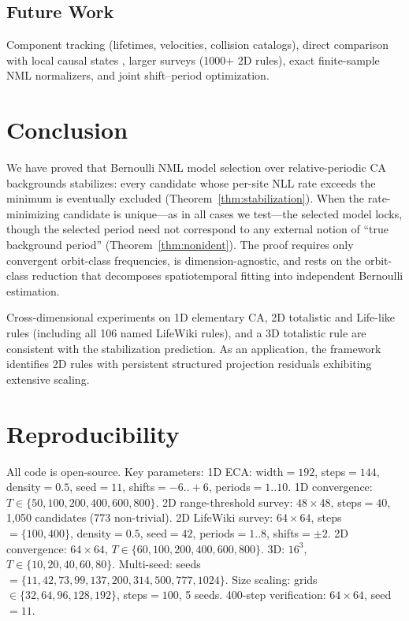 \documentclass[letterpaper]{article}
\theoremstyle{definition}
\theoremstyle{remark}
\begin{document}
\subsection{Future Work}

Component tracking (lifetimes, velocities, collision catalogs), direct comparison with local causal states \citep{rupe2018}, larger surveys (1000+ 2D rules), exact finite-sample NML normalizers, and joint shift--period optimization.

\section{Conclusion}

We have proved that Bernoulli NML model selection over relative-periodic CA backgrounds stabilizes: every candidate whose per-site NLL rate exceeds the minimum is eventually excluded (Theorem~\ref{thm:stabilization}).
When the rate-minimizing candidate is unique---as in all cases we test---the selected model locks, though the selected period need not correspond to any external notion of ``true background period'' (Theorem~\ref{thm:nonident}).
The proof requires only convergent orbit-class frequencies, is dimension-agnostic, and rests on the orbit-class reduction that decomposes spatiotemporal fitting into independent Bernoulli estimation.

Cross-dimensional experiments on 1D elementary CA, 2D totalistic and Life-like rules (including all 106 named LifeWiki rules), and a 3D totalistic rule are consistent with the stabilization prediction.
As an application, the framework identifies 2D rules with persistent structured projection residuals exhibiting extensive scaling.

\section*{Reproducibility}

All code is open-source.
Key parameters:
1D ECA: width${}=192$, steps${}=144$, density${}=0.5$, seed${}=11$, shifts${}=-6..{+}6$, periods${}=1..10$.
1D convergence: $T \in \{50, 100, 200, 400, 600, 800\}$.
2D range-threshold survey: $48 \times 48$, steps${}=40$, 1{,}050 candidates (773 non-trivial).
2D LifeWiki survey: $64 \times 64$, steps${}=\{100, 400\}$, density${}=0.5$, seed${}=42$, periods${}=1..8$, shifts${}=\pm 2$.
2D convergence: $64 \times 64$, $T \in \{60, 100, 200, 400, 600, 800\}$.
3D: $16^3$, $T \in \{10, 20, 40, 60, 80\}$.
Multi-seed: seeds $= \{11, 42, 73, 99, 137, 200, 314, 500, 777, 1024\}$.
Size scaling: grids $\in \{32, 64, 96, 128, 192\}$, steps${}=100$, 5 seeds.
400-step verification: $64 \times 64$, seed${}=11$.
\end{document}
